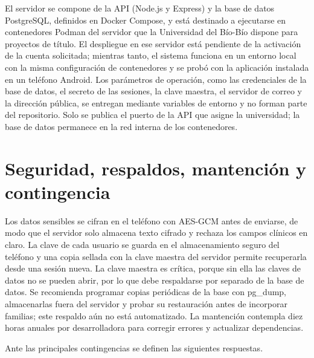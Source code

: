 El servidor se compone de la API (Node.js y Express) y la base de datos
PostgreSQL, definidos en Docker Compose, y está destinado a ejecutarse en
contenedores Podman del servidor que la Universidad del Bío-Bío dispone para
proyectos de título. El despliegue en ese servidor está pendiente de la
activación de la cuenta solicitada; mientras tanto, el sistema funciona en un
entorno local con la misma configuración de contenedores y se probó con la
aplicación instalada en un teléfono Android. Los parámetros de operación, como
las credenciales de la base de datos, el secreto de las sesiones, la clave
maestra, el servidor de correo y la dirección pública, se entregan mediante
variables de entorno y no forman parte del repositorio. Solo se publica el
puerto de la API que asigne la universidad; la base de datos permanece en la
red interna de los contenedores.

\section*{Seguridad, respaldos, mantención y contingencia}

Los datos sensibles se cifran en el teléfono con AES-GCM antes de enviarse, de
modo que el servidor solo almacena texto cifrado y rechaza los campos clínicos
en claro. La clave de cada usuario se guarda en el almacenamiento seguro del
teléfono y una copia sellada con la clave maestra del servidor permite
recuperarla desde una sesión nueva. La clave maestra es crítica, porque sin ella
las claves de datos no se pueden abrir, por lo que debe respaldarse por separado
de la base de datos. Se recomienda programar copias periódicas de la base con
pg\_dump, almacenarlas fuera del servidor y probar su restauración antes de
incorporar familias; este respaldo aún no está automatizado. La mantención
contempla diez horas anuales por desarrolladora para corregir errores y
actualizar dependencias.

Ante las principales contingencias se definen las siguientes respuestas.

